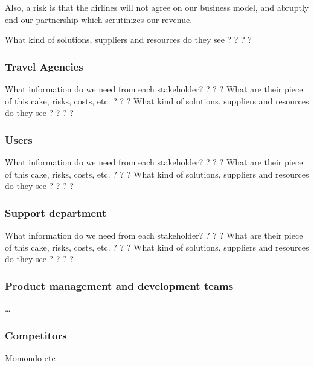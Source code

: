 Also, a risk is that the airlines will not agree on our business model, and abruptly end our partnership which scrutinizes our revenue.

What kind of solutions, suppliers and resources do they see  ? ? ? ?


\subsubsection{Travel Agencies}
What information do we need from each stakeholder? ? ? ?
What are their piece of this cake, risks, costs, etc. ? ? ? 
What kind of solutions, suppliers and resources do they see  ? ? ? ?

    

\subsubsection{Users}
What information do we need from each stakeholder? ? ? ?
What are their piece of this cake, risks, costs, etc. ? ? ? 
What kind of solutions, suppliers and resources do they see  ? ? ? ?


\subsubsection{Support department}
What information do we need from each stakeholder? ? ? ?
What are their piece of this cake, risks, costs, etc. ? ? ? 
What kind of solutions, suppliers and resources do they see  ? ? ? ?

\subsubsection{Product management and development teams}
\dots

\subsubsection{Competitors}
Momondo etc

\subsection{}
